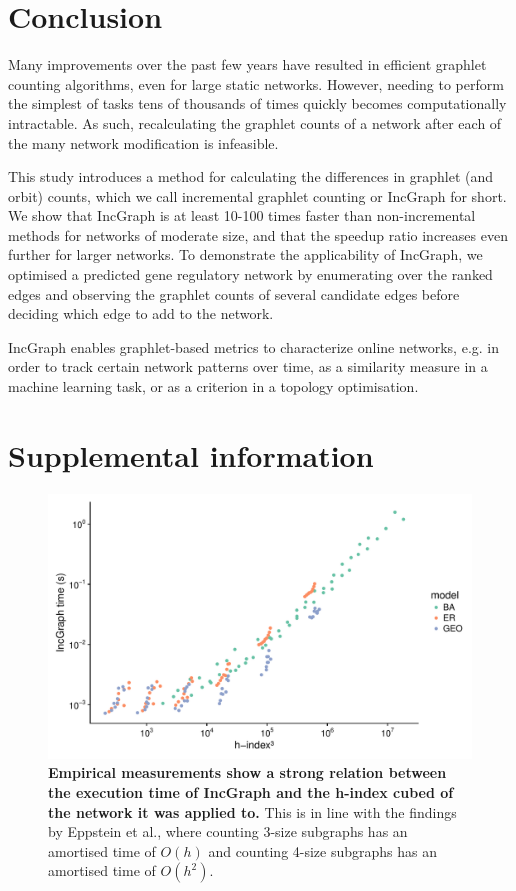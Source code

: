 \section*{Conclusion}
Many improvements over the past few years have resulted in efficient graphlet counting algorithms, even for large static networks. However, needing to perform the simplest of tasks tens of thousands of times quickly becomes computationally intractable. As such, recalculating the graphlet counts of a network after each of the many network modification is infeasible.

This study introduces a method for calculating the differences in graphlet (and orbit) counts, which we call incremental graphlet counting or IncGraph for short. We show that IncGraph is at least 10-100 times faster than non-incremental methods for networks of moderate size, and that the speedup ratio increases even further for larger networks. 
To demonstrate the applicability of IncGraph, we optimised a predicted gene regulatory network by enumerating over the ranked edges and observing the graphlet counts of several candidate edges before deciding which edge to add to the network.

IncGraph enables graphlet-based metrics to characterize online networks, e.g. in order to track certain network patterns over time, as a similarity measure in a machine learning task, or as a criterion in a topology optimisation.


\section{Supplemental information}

\newcommand{\pluseq}{\mathrel{+}=}
\newcommand{\asteq}{\mathrel{*}=}

\begin{figure}[htb!]
	\centering
	\includegraphics[width=.8\linewidth]{fig/figureS1.pdf} 
	\caption{
		\textbf{Empirical measurements show a strong relation between the execution time of IncGraph and the h-index cubed of the network it was applied to.} This is in line with the findings by Eppstein et al., where counting 3-size subgraphs has an amortised time of $O(h)$ and counting 4-size subgraphs has an amortised time of $O(h^2)$.
	}
	\label{sfig_hindex}
\end{figure}

